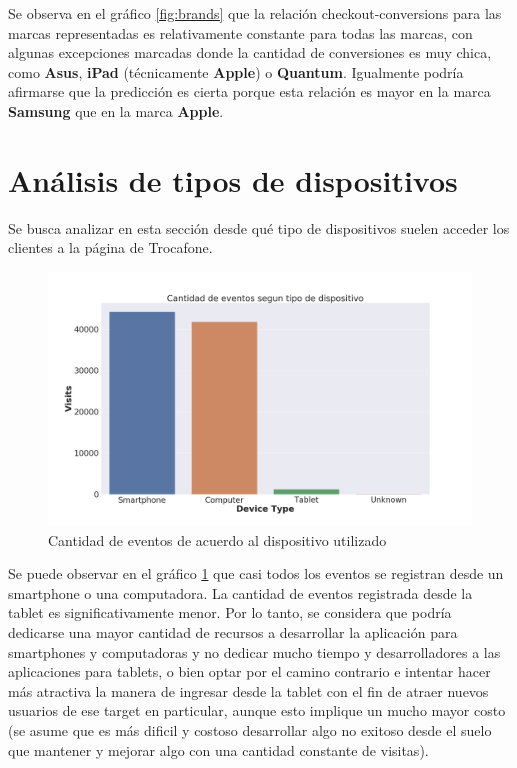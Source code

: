 \documentclass[a4paper]{article}
\begin{document}
Se observa en el gráfico \ref{fig:brands} que la relación checkout-conversions para las marcas representadas es relativamente constante para todas las marcas, con algunas excepciones marcadas donde la cantidad de conversiones es muy chica, como \textbf{Asus}, \textbf{iPad} (técnicamente \textbf{Apple}) o \textbf{Quantum}. Igualmente podría afirmarse que la predicción es cierta porque esta relación es mayor en la marca \textbf{Samsung} que en la marca \textbf{Apple}.

\section{Análisis de tipos de dispositivos}

Se busca analizar en esta sección desde qué tipo de dispositivos suelen acceder los clientes a la página de Trocafone.

\begin{figure}[!h]
	\includegraphics[width=\linewidth]{figures/150-eventos_tipo-barplot.png}
	\caption{Cantidad de eventos de acuerdo al dispositivo utilizado}
	\label{fig:dispositivos}
\end{figure}

Se puede observar en el gráfico \ref{fig:dispositivos} que casi todos los eventos se registran desde un smartphone o una computadora. La cantidad de eventos registrada desde la tablet es significativamente menor. Por lo tanto, se considera que podría dedicarse una mayor cantidad de recursos a desarrollar la aplicación para smartphones y computadoras y no dedicar mucho tiempo y desarrolladores a las aplicaciones para tablets, o bien optar por el camino contrario e intentar hacer más atractiva la manera de ingresar desde la tablet con el fin de atraer nuevos usuarios de ese target en particular, aunque esto implique un mucho mayor costo (se asume que es más dificil y costoso desarrollar algo no exitoso desde el suelo que mantener y mejorar algo con una cantidad constante de visitas).
\end{document}
